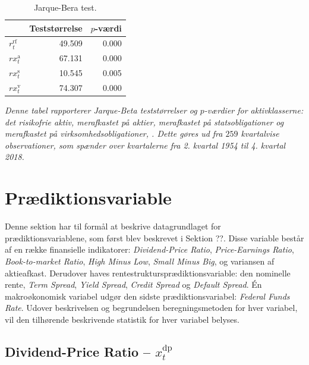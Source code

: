 \documentclass[
  a4paper,
  oneside]{memoir}
\begin{document}
\begin{table}[H]

\caption{\label{tab:JB-AKTIVKLASSE}Jarque-Bera test.}
\centering
\begin{threeparttable}
\begin{tabular}[t]{lrr}
\toprule
  & Teststørrelse & $p$-værdi\\
\midrule
\rowcolor{gray!6}  $r_t^{\text{rf}}$ & 49.509 & 0.000\\
$rx_t^{\text{a}}$ & 67.131 & 0.000\\
\rowcolor{gray!6}  $rx_t^{\text{s}}$ & 10.545 & 0.005\\
$rx_t^{\text{v}}$ & 74.307 & 0.000\\
\bottomrule
\end{tabular}
\begin{tablenotes}
\item \textit{Denne tabel rapporterer Jarque-Beta teststørrelser og $p$-værdier for aktivklasserne: det risikofrie aktiv, merafkastet på aktier, merafkastet på statsobligationer og merafkastet på virksomhedsobligationer, \citep{Jarque1980}. Dette gøres ud fra $259$ kvartalvise observationer, som spænder over kvartalerne fra 2. kvartal 1954 til 4. kvartal 2018.}
\end{tablenotes}
\end{threeparttable}
\end{table}

\hypertarget{pvariable}{%
\section{Prædiktionsvariable}\label{pvariable}}

Denne sektion har til formål at beskrive datagrundlaget for prædiktionsvariablene, som først blev beskrevet i Sektion ??. Disse variable består af en række finansielle indikatorer: \emph{Dividend-Price Ratio}, \emph{Price-Earnings Ratio}, \emph{Book-to-market Ratio}, \emph{High Minus Low}, \emph{Small Minus Big}, og variansen af aktieafkast. Derudover haves rentestruktursprædiktionsvariable: den nominelle rente, \emph{Term Spread}, \emph{Yield Spread}, \emph{Credit Spread} og \emph{Default Spread}. Én makroøkonomisk variabel udgør den sidste prædiktionsvariabel: \emph{Federal Funds Rate}. Udover beskrivelsen og begrundelsen beregningsmetoden for hver variabel, vil den tilhørende beskrivende statistik for hver variabel belyses.

\hypertarget{dividend-price-ratio-x_ttextdp}{%
\subsection{\texorpdfstring{Dividend-Price Ratio -- \(x_t^{\text{dp}}\)}{Dividend-Price Ratio -- x\_t\^{}\{\textbackslash text\{dp\}\}}}\label{dividend-price-ratio-x_ttextdp}}
\end{document}
